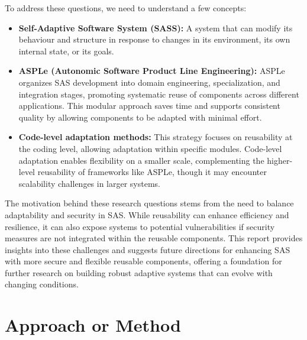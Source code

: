\documentclass[a4paper,10pt]{article}
\begin{document}
To address these questions, we need to understand a few concepts:

\begin{itemize}
    \item \textbf{Self-Adaptive Software System (SASS):} A system that can modify its behaviour and structure in response to changes in its environment, its own internal state, or its goals.
    
    \item \textbf{ASPLe (Autonomic Software Product Line Engineering):} ASPLe organizes SAS development into domain engineering, specialization, and integration stages, promoting systematic reuse of components across different applications. This modular approach saves time and supports consistent quality by allowing components to be adapted with minimal effort.
    
    \item \textbf{Code-level adaptation methods:} This strategy focuses on reusability at the coding level, allowing adaptation within specific modules. Code-level adaptation enables flexibility on a smaller scale, complementing the higher-level reusability of frameworks like ASPLe, though it may encounter scalability challenges in larger systems.
    
\end{itemize}

The motivation behind these research questions stems from the need to balance adaptability and security in SAS. While reusability can enhance efficiency and resilience, it can also expose systems to potential vulnerabilities if security measures are not integrated within the reusable components. This report provides insights into these challenges and suggests future directions for enhancing SAS with more secure and flexible reusable components, offering a foundation for further research on building robust adaptive systems that can evolve with changing conditions.

\section{Approach or Method}
\end{document}
